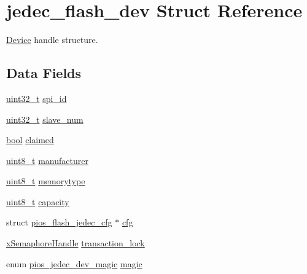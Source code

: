 \hypertarget{structjedec__flash__dev}{\section{jedec\-\_\-flash\-\_\-dev Struct Reference}
\label{structjedec__flash__dev}
}


\hyperlink{struct_device}{Device} handle structure.  


\subsection*{Data Fields}
\begin{DoxyCompactItemize}
\item 
\hyperlink{stdint_8h_a435d1572bf3f880d55459d9805097f62}{uint32\-\_\-t} \hyperlink{group___p_i_o_s___f_l_a_s_h_ga0f87de9cf831cf45ad2e81d4629cf021}{spi\-\_\-id}
\item 
\hyperlink{stdint_8h_a435d1572bf3f880d55459d9805097f62}{uint32\-\_\-t} \hyperlink{group___p_i_o_s___f_l_a_s_h_ga38ca35aafe78e6032326184768221fab}{slave\-\_\-num}
\item 
\hyperlink{group___exported__types_gaf6a258d8f3ee5206d682d799316314b1}{bool} \hyperlink{group___p_i_o_s___f_l_a_s_h_ga0252ff9aa887c054e7299923b344bf59}{claimed}
\item 
\hyperlink{stdint_8h_aba7bc1797add20fe3efdf37ced1182c5}{uint8\-\_\-t} \hyperlink{group___p_i_o_s___f_l_a_s_h_gaf7bb5593bcefe3837116c4bdb768cd6e}{manufacturer}
\item 
\hyperlink{stdint_8h_aba7bc1797add20fe3efdf37ced1182c5}{uint8\-\_\-t} \hyperlink{group___p_i_o_s___f_l_a_s_h_ga68ce126b7f544ebb02fa8beab9b9faa2}{memorytype}
\item 
\hyperlink{stdint_8h_aba7bc1797add20fe3efdf37ced1182c5}{uint8\-\_\-t} \hyperlink{group___p_i_o_s___f_l_a_s_h_ga4253b6dd4128fd223d200bed60696804}{capacity}
\item 
struct \hyperlink{structpios__flash__jedec__cfg}{pios\-\_\-flash\-\_\-jedec\-\_\-cfg} $\ast$ \hyperlink{group___p_i_o_s___f_l_a_s_h_ga26db753e18e085086b539aca2438ee45}{cfg}
\item 
\hyperlink{_common_2_libraries_2_free_r_t_o_s_2_source_2include_2semphr_8h_aa91aa1b6835a184838f9ccf138a6ad10}{x\-Semaphore\-Handle} \hyperlink{group___p_i_o_s___f_l_a_s_h_ga28870637f7372faa2a3fb2bd887a4ab7}{transaction\-\_\-lock}
\item 
enum \hyperlink{group___p_i_o_s___f_l_a_s_h_ga3e7c01370e9757b84f3a37ec903714f3}{pios\-\_\-jedec\-\_\-dev\-\_\-magic} \hyperlink{group___p_i_o_s___f_l_a_s_h_gaf71b8f686812a43a77983b3ec807aed7}{magic}
\end{DoxyCompactItemize}


